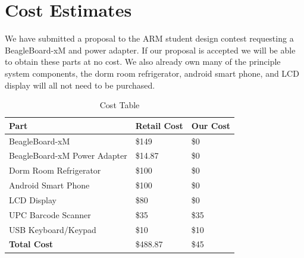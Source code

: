 \documentclass[11pt,letterpaper]{article}
\begin{document}
\section{Cost Estimates}
We have submitted a proposal to the ARM student design contest requesting a BeagleBoard-xM and power adapter. If our proposal is accepted we will be able to obtain these parts at no cost. We also already own many of the principle system components, the dorm room refrigerator, android smart phone, and LCD display will all not need to be purchased.
\begin{table}[h!]
\begin{center}
\caption{Cost Table}
\label{tab:cost}
\begin{tabular}{| p{2.5in} | p{1.75in} |p{1.75in} |}
\hline
Part & Retail Cost & Our Cost \\
\hline
BeagleBoard-xM & \$149 & \$0 \\
\hline
BeagleBoard-xM Power Adapter & \$14.87 & \$0 \\
\hline
Dorm Room Refrigerator & \$100 & \$0 \\
\hline
Android Smart Phone & \$100 & \$0  \\
\hline
LCD Display & \$80  & \$0 \\
\hline
UPC Barcode Scanner & \$35 & \$35 \\
\hline
USB Keyboard/Keypad & \$10 & \$10 \\
\hline
\hline
\textbf{Total Cost} & \$488.87 & \$45 \\
\hline
\end{tabular}
\end{center}
\end{table}
\end{document}
